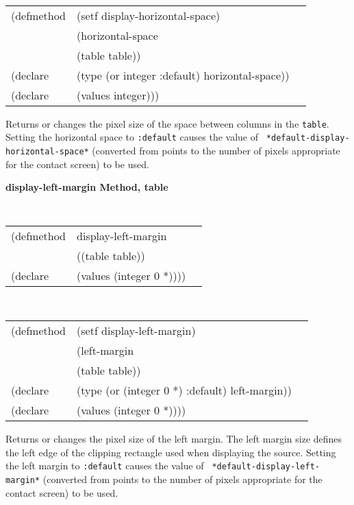 \begin{flushright} \parbox[t]{6.125in}{
\tt
\begin{tabular}{lll}
\raggedright
(defmethod & (setf display-horizontal-space) & \\
& (horizontal-space \\
& (table  table)) \\
(declare &(type (or integer :default)  horizontal-space))\\
(declare & (values integer)))
\end{tabular}
\rm}\end{flushright}

\begin{flushright} \parbox[t]{6.125in}{ 
Returns or changes the pixel size of the space between columns in the {\tt table}.  
Setting the horizontal space to {\tt :default} causes the value of {\tt
*default-display-horizontal-space*} (converted from points to the number of pixels
appropriate for the contact screen) to be used.
  
}\end{flushright}


{\samepage  
{\large {\bf display-left-margin \hfill Method, table}}
\begin{flushright} \parbox[t]{6.125in}{
\tt
\begin{tabular}{lll}
\raggedright
(defmethod & display-left-margin & \\
& ((table  table)) \\
(declare & (values (integer 0 *))))
\end{tabular}
\rm

}\end{flushright}}

\begin{flushright} \parbox[t]{6.125in}{
\tt
\begin{tabular}{lll}
\raggedright
(defmethod & (setf display-left-margin) & \\
         & (left-margin \\
         & (table  table)) \\
(declare &(type (or (integer 0 *) :default)  left-margin))\\
(declare & (values (integer 0 *))))
\end{tabular}
\rm}
\end{flushright}

\begin{flushright} \parbox[t]{6.125in}{
Returns or changes the pixel size of the
left margin.  The left margin size defines
the left edge of the clipping rectangle used when displaying the source.
Setting the left margin to {\tt :default} causes the value of {\tt
*default-display-left-margin*} (converted from points to the number of pixels
appropriate for the contact screen) to be used.
}
\end{flushright}


